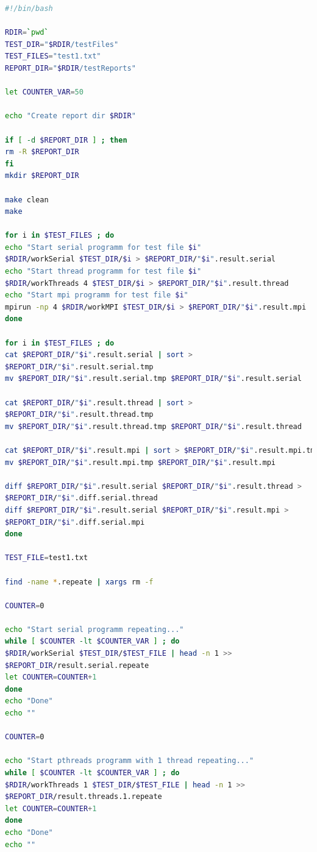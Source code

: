 \documentclass[12pt,a4paper]{report}
\begin{document}
				
			
				\begin{lstlisting}[language=bash,caption={bash version},texcl=true,
				frame=single,
				breaklines=true,
				extendedchars=\true]
#!/bin/bash
	
RDIR=`pwd`
TEST_DIR="$RDIR/testFiles"
TEST_FILES="test1.txt"
REPORT_DIR="$RDIR/testReports"

let COUNTER_VAR=50
			
echo "Create report dir $RDIR"
	
if [ -d $REPORT_DIR ] ; then
rm -R $REPORT_DIR
fi
mkdir $REPORT_DIR
			
make clean
make
			
for i in $TEST_FILES ; do
echo "Start serial programm for test file $i"
$RDIR/workSerial $TEST_DIR/$i > $REPORT_DIR/"$i".result.serial
echo "Start thread programm for test file $i"
$RDIR/workThreads 4 $TEST_DIR/$i > $REPORT_DIR/"$i".result.thread
echo "Start mpi programm for test file $i"
mpirun -np 4 $RDIR/workMPI $TEST_DIR/$i > $REPORT_DIR/"$i".result.mpi
done
		
for i in $TEST_FILES ; do
cat $REPORT_DIR/"$i".result.serial | sort > 
$REPORT_DIR/"$i".result.serial.tmp
mv $REPORT_DIR/"$i".result.serial.tmp $REPORT_DIR/"$i".result.serial
			
cat $REPORT_DIR/"$i".result.thread | sort > 
$REPORT_DIR/"$i".result.thread.tmp
mv $REPORT_DIR/"$i".result.thread.tmp $REPORT_DIR/"$i".result.thread
	
cat $REPORT_DIR/"$i".result.mpi | sort > $REPORT_DIR/"$i".result.mpi.tmp
mv $REPORT_DIR/"$i".result.mpi.tmp $REPORT_DIR/"$i".result.mpi
			
diff $REPORT_DIR/"$i".result.serial $REPORT_DIR/"$i".result.thread >
$REPORT_DIR/"$i".diff.serial.thread
diff $REPORT_DIR/"$i".result.serial $REPORT_DIR/"$i".result.mpi >
$REPORT_DIR/"$i".diff.serial.mpi
done
			
TEST_FILE=test1.txt
		
find -name *.repeate | xargs rm -f
			
COUNTER=0
			
echo "Start serial programm repeating..."
while [ $COUNTER -lt $COUNTER_VAR ] ; do
$RDIR/workSerial $TEST_DIR/$TEST_FILE | head -n 1 >>
$REPORT_DIR/result.serial.repeate
let COUNTER=COUNTER+1 
done
echo "Done"
echo ""
			
COUNTER=0
			
echo "Start pthreads programm with 1 thread repeating..."
while [ $COUNTER -lt $COUNTER_VAR ] ; do
$RDIR/workThreads 1 $TEST_DIR/$TEST_FILE | head -n 1 >>
$REPORT_DIR/result.threads.1.repeate
let COUNTER=COUNTER+1 
done
echo "Done"
echo ""
			

\end{lstlisting}
\end{document}
